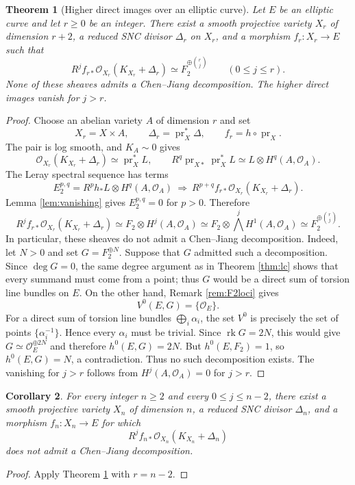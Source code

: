 \documentclass[11pt,letterpaper]{article}
\theoremstyle{paper}
\newtheorem{theorem}{Theorem}[section]
\newtheorem{corollary}[theorem]{Corollary}
\newcommand{\OO}{\mathcal O}
\DeclareMathOperator{\pr}{pr}
\DeclareMathOperator{\rk}{rk}
\begin{document}
\begin{theorem}[Higher direct images over an elliptic curve]\label{thm:higher}
Let $E$ be an elliptic curve and let $r\ge0$ be an integer. There exist a smooth projective variety $X_r$ of dimension $r+2$, a reduced SNC divisor $\Delta_r$ on $X_r$, and a morphism $f_r:X_r\to E$ such that
\[
R^jf_{r*}\OO_{X_r}(K_{X_r}+\Delta_r)\simeq F_2^{\oplus\binom rj}\qquad(0\le j\le r).
\]
None of these sheaves admits a Chen--Jiang decomposition. The higher direct images vanish for $j>r$.
\end{theorem}
\begin{proof}
Choose an abelian variety $A$ of dimension $r$ and set
\[
X_r=X\times A,\qquad\Delta_r=\pr_X^*\Delta,\qquad f_r=h\circ\pr_X.
\]
The pair is log smooth, and $K_A\sim0$ gives
\[
\OO_{X_r}(K_{X_r}+\Delta_r)\simeq\pr_X^*L,\qquad
R^q\pr_{X*}\pr_X^*L\simeq L\otimes H^q(A,\OO_A).
\]
The Leray spectral sequence has terms
\[
E_2^{p,q}=R^ph_*L\otimes H^q(A,\OO_A)
\ \Longrightarrow\ R^{p+q}f_{r*}\OO_{X_r}(K_{X_r}+\Delta_r).
\]
Lemma \ref{lem:vanishing} gives $E_2^{p,q}=0$ for $p>0$. Therefore
\[
R^jf_{r*}\OO_{X_r}(K_{X_r}+\Delta_r)
\simeq F_2\otimes H^j(A,\OO_A)
\simeq F_2\otimes\bigwedge^jH^1(A,\OO_A)
\simeq F_2^{\oplus\binom rj}.
\]
In particular, these sheaves do not admit a Chen--Jiang decomposition. Indeed, let $N>0$ and set $G=F_2^{\oplus N}$. Suppose that $G$ admitted such a decomposition. Since $\deg G=0$, the same degree argument as in Theorem \ref{thm:lc} shows that every summand must come from a point; thus $G$ would be a direct sum of torsion line bundles on $E$. On the other hand, Remark \ref{rem:F2loci} gives
\[
V^0(E,G)=\{\OO_E\}.
\]
For a direct sum of torsion line bundles $\bigoplus_i\alpha_i$, the set $V^0$ is precisely the set of points $\{\alpha_i^{-1}\}$. Hence every $\alpha_i$ must be trivial. Since $\rk G=2N$, this would give $G\simeq\OO_E^{\oplus2N}$ and therefore $h^0(E,G)=2N$. But $h^0(E,F_2)=1$, so $h^0(E,G)=N$, a contradiction. Thus no such decomposition exists. The vanishing for $j>r$ follows from $H^j(A,\OO_A)=0$ for $j>r$.
\end{proof}

\begin{corollary}
For every integer $n\ge2$ and every $0\le j\le n-2$, there exist a smooth projective variety $X_n$ of dimension $n$, a reduced SNC divisor $\Delta_n$, and a morphism $f_n:X_n\to E$ for which
\[
R^jf_{n*}\OO_{X_n}(K_{X_n}+\Delta_n)
\]
does not admit a Chen--Jiang decomposition.
\end{corollary}
\begin{proof}
Apply Theorem \ref{thm:higher} with $r=n-2$.
\end{proof}
\end{document}
